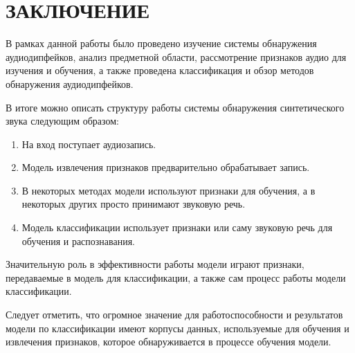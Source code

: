 \part*{ЗАКЛЮЧЕНИЕ}

В рамках данной работы было проведено изучение системы обнаружения аудиодипфейков, анализ предметной области, рассмотрение признаков аудио для изучения и обучения, а также проведена классификация и обзор методов обнаружения аудиодипфейков.

В итоге можно описать структуру работы системы обнаружения синтетического звука следующим образом:

\begin{enumerate}
    \item На вход поступает аудиозапись.
    \item Модель извлечения признаков предварительно обрабатывает запись.
    \item В некоторых методах модели используют признаки для обучения, а в некоторых других просто принимают звуковую речь.
    \item Модель классификации использует признаки или саму звуковую речь для обучения и распознавания.
\end{enumerate}

Значительную роль в эффективности работы модели играют признаки, передаваемые в модель для классификации, а также сам процесс работы модели классификации.

Следует отметить, что огромное значение для работоспособности и результатов модели по классификации имеют корпусы данных, используемые для обучения и извлечения признаков, которое обнаруживается в процессе обучения модели.